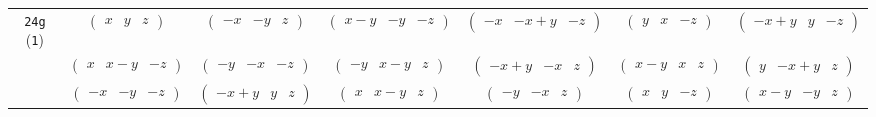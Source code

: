 \documentclass[fleqn,9pt,landscape]{jsarticle}
\begin{document}
\begin{center}
\begin{longtable}{ccccccc}
{\tt 24g} ({\tt 1}) & $ \begin{pmatrix} x & y & z \end{pmatrix} $ & $ \begin{pmatrix} - x & - y & z \end{pmatrix} $ & $ \begin{pmatrix} x - y & - y & - z \end{pmatrix} $ & $ \begin{pmatrix} - x & - x + y & - z \end{pmatrix} $ & $ \begin{pmatrix} y & x & - z \end{pmatrix} $ & $ \begin{pmatrix} - x + y & y & - z \end{pmatrix} $ \\
& $ \begin{pmatrix} x & x - y & - z \end{pmatrix} $ & $ \begin{pmatrix} - y & - x & - z \end{pmatrix} $ & $ \begin{pmatrix} - y & x - y & z \end{pmatrix} $ & $ \begin{pmatrix} - x + y & - x & z \end{pmatrix} $ & $ \begin{pmatrix} x - y & x & z \end{pmatrix} $ & $ \begin{pmatrix} y & - x + y & z \end{pmatrix} $ \\
& $ \begin{pmatrix} - x & - y & - z \end{pmatrix} $ & $ \begin{pmatrix} - x + y & y & z \end{pmatrix} $ & $ \begin{pmatrix} x & x - y & z \end{pmatrix} $ & $ \begin{pmatrix} - y & - x & z \end{pmatrix} $ & $ \begin{pmatrix} x & y & - z \end{pmatrix} $ & $ \begin{pmatrix} x - y & - y & z \end{pmatrix} $ \\

\end{longtable}
\end{center}
\end{document}
